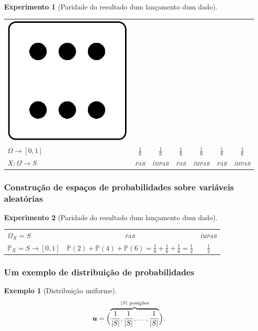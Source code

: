 \documentclass{beamer}
\def\Prob{\mathbb{P}} %
\def\MMp{\mathrm{.}} %
\def\cardi#1{\lvert #1 \rvert} %
\def\funcao#1#2#3{#1\colon #2\rightarrow #3} %
\def\vetor#1{\boldsymbol{#1}}
\theoremstyle{teoaxicorlem}
\theoremstyle{defnotnom}
\newtheorem{Ex}{Exemplo}
\newtheorem{Expr}{Experimento}
\begin{document}
\begin{frame}
\begin{Expr}[Paridade do resultado dum lançamento dum dado]
\begin{tabular}{lcccccc}
      \includegraphics[width=.05\paperwidth]{dado6.eps} \\[12pt]\pause
      $\Omega\rightarrow[0,1]$ &
      $\frac16$ & $\frac16$ & $\frac16$ & $\frac16$ & $\frac16$ &
      $\frac16$ \\[12pt]\pause
      $\funcao{X}{\Omega}{S}$ &
      \textsc{par} & \textsc{ímpar} &
      \textsc{par} & \textsc{ímpar} &
      \textsc{par} & \textsc{ímpar}
    \end{tabular}
  \end{Expr}
\end{frame}

\begin{frame}
  \frametitle{Construção de espaços de probabilidades sobre variáveis
    aleatórias}
  \begin{Expr}[Paridade do resultado dum lançamento dum dado]
    \begin{tabular}{lcc}
      \alert{$\Omega_X=S$} &
      \textsc{par} & \textsc{ímpar} \\\pause
      \alert{$\Prob_X=S\rightarrow [0,1]$} &\pause
      $\Prob(2)+\Prob(4)+\Prob(6)=
      \frac16+\frac16+\frac16=\frac12$ &\pause
      $\frac12$
    \end{tabular}
  \end{Expr}
\end{frame}

\begin{frame}
  \frametitle{Um exemplo de distribuição de probabilidades}
  \begin{Ex}[Distribuição uniforme]
    \begin{equation*}
      \vetor u =
      \Bigl(\overbrace{\frac1{\cardi{S}},
        \frac1{\cardi{S}},\dotsc,\frac1{\cardi{S}}}^{
        \text{$\cardi{S}$ posições}
      }\Bigr)\MMp
    \end{equation*}
  \end{Ex}
\end{frame}
\end{document}
